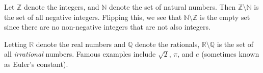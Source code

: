         \begin{example}
            Let $\mathbb{Z}$ denote the integers, and $\mathbb{N}$ denote the
            set of natural numbers. Then $\mathbb{Z}\setminus\mathbb{N}$ is the
            set of all negative integers. Flipping this, we see that
            $\mathbb{N}\setminus\mathbb{Z}$ is the empty set since there are no
            non-negative integers that are not also integers.
        \end{example}
        \begin{example}
            Letting $\mathbb{R}$ denote the real numbers and $\mathbb{Q}$ denote
            the rationals, $\mathbb{R}\setminus\mathbb{Q}$ is the set of all
            \textit{irrational} numbers. Famous examples include $\sqrt{2}$,
            $\pi$, and $e$ (sometimes known as Euler's constant).
        \end{example}
